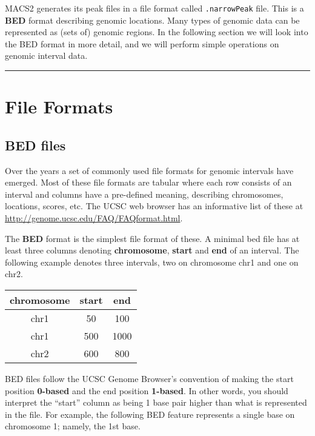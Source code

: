\documentclass[11pt]{article}
\begin{document}
    MACS2 generates its peak files in a file format called
\texttt{.narrowPeak} file. This is a \textbf{BED} format describing
genomic locations. Many types of genomic data can be represented as
(sets of) genomic regions. In the following section we will look into
the BED format in more detail, and we will perform simple operations on
genomic interval data.

    \begin{center}\rule{0.5\linewidth}{.4pt}\end{center}





\newpage





    \hypertarget{file-formats}{%
\section{File Formats}\label{file-formats}}

\hypertarget{bed-files}{%
\subsection{BED files}\label{bed-files}}

Over the years a set of commonly used file formats for genomic intervals
have emerged. Most of these file formats are tabular where each row
consists of an interval and columns have a pre-defined meaning,
describing chromosomes, locations, scores, etc. The UCSC web browser has
an informative list of these at
\url{http://genome.ucsc.edu/FAQ/FAQformat.html}.

The \textbf{BED} format is the simplest file format of these. A minimal
bed file has at least three columns denoting \textbf{chromosome},
\textbf{start} and \textbf{end} of an interval. The following example
denotes three intervals, two on chromosome chr1 and one on chr2.

    \begin{longtable}[]{@{}ccc@{}}
\hline
chromosome & start & end\tabularnewline
\hline
\endhead
chr1 & 50 & 100\tabularnewline
chr1 & 500 & 1000\tabularnewline
chr2 & 600 & 800\tabularnewline
\hline
\end{longtable}

    BED files follow the UCSC Genome Browser's convention of making the
start position \textbf{0-based} and the end position \textbf{1-based}.
In other words, you should interpret the ``start'' column as being 1
base pair higher than what is represented in the file. For example, the
following BED feature represents a single base on chromosome 1; namely,
the 1st base.
\end{document}
